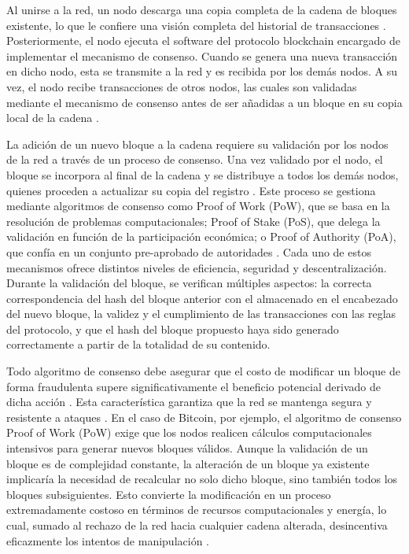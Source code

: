 Al unirse a la red, un nodo descarga una copia completa de la cadena de bloques existente, lo que le confiere una visión completa del historial de transacciones \cite{bulkowska2023implementation}. Posteriormente, el nodo ejecuta el software del protocolo blockchain encargado de implementar el mecanismo de consenso. Cuando se genera una nueva transacción en dicho nodo, esta se transmite a la red y es recibida por los demás nodos. A su vez, el nodo recibe transacciones de otros nodos, las cuales son validadas mediante el mecanismo de consenso antes de ser añadidas a un bloque en su copia local de la cadena \cite{bulkowska2023implementation}.

La adición de un nuevo bloque a la cadena requiere su validación por los nodos de la red a través de un proceso de consenso. Una vez validado por el nodo, el bloque se incorpora al final de la cadena y se distribuye a todos los demás nodos, quienes proceden a actualizar su copia del registro \cite{bulkowska2023implementation}. Este proceso se gestiona mediante algoritmos de consenso como Proof of Work (PoW), que se basa en la resolución de problemas computacionales; Proof of Stake (PoS), que delega la validación en función de la participación económica; o Proof of Authority (PoA), que confía en un conjunto pre-aprobado de autoridades \cite{diaz2022protocolos}. Cada uno de estos mecanismos ofrece distintos niveles de eficiencia, seguridad y descentralización. Durante la validación del bloque, se verifican múltiples aspectos: la correcta correspondencia del hash del bloque anterior con el almacenado en el encabezado del nuevo bloque, la validez y el cumplimiento de las transacciones con las reglas del protocolo, y que el hash del bloque propuesto haya sido generado correctamente a partir de la totalidad de su contenido.

Todo algoritmo de consenso debe asegurar que el costo de modificar un bloque de forma fraudulenta supere significativamente el beneficio potencial derivado de dicha acción \cite{satoshi2008bitcoin}. Esta característica garantiza que la red se mantenga segura y resistente a ataques \cite{buterin2013ethereum}. En el caso de Bitcoin, por ejemplo, el algoritmo de consenso Proof of Work (PoW) exige que los nodos realicen cálculos computacionales intensivos para generar nuevos bloques válidos. Aunque la validación de un bloque es de complejidad constante, la alteración de un bloque ya existente implicaría la necesidad de recalcular no solo dicho bloque, sino también todos los bloques subsiguientes. Esto convierte la modificación en un proceso extremadamente costoso en términos de recursos computacionales y energía, lo cual, sumado al rechazo de la red hacia cualquier cadena alterada, desincentiva eficazmente los intentos de manipulación \cite{satoshi2008bitcoin}.

